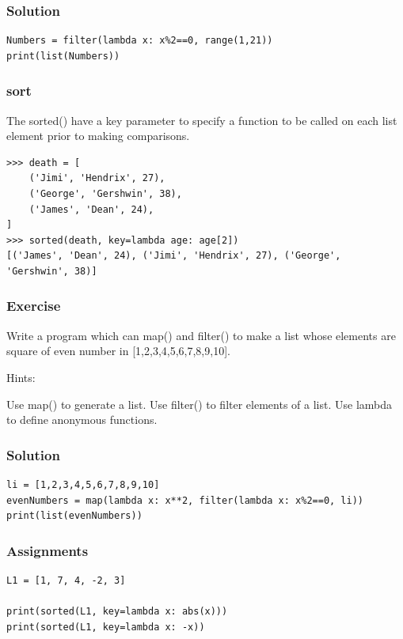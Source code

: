 \begin{frame}[fragile]\frametitle{Solution}
\begin{lstlisting}
Numbers = filter(lambda x: x%2==0, range(1,21))
print(list(Numbers))
\end{lstlisting}
\end{frame}


\begin{frame}[fragile]\frametitle{sort}
The sorted() have a key parameter to specify a function to be called on each list element prior to making comparisons.
\begin{lstlisting}
>>> death = [
    ('Jimi', 'Hendrix', 27),
    ('George', 'Gershwin', 38),
    ('James', 'Dean', 24),
]
>>> sorted(death, key=lambda age: age[2])
[('James', 'Dean', 24), ('Jimi', 'Hendrix', 27), ('George', 'Gershwin', 38)]
\end{lstlisting}
\end{frame}


\begin{frame}[fragile]\frametitle{Exercise}
Write a program which can map() and filter() to make a list whose elements are square of even number in [1,2,3,4,5,6,7,8,9,10].

Hints:

Use map() to generate a list.
Use filter() to filter elements of a list.
Use lambda to define anonymous functions.

\end{frame}

\begin{frame}[fragile]\frametitle{Solution}
\begin{lstlisting}
li = [1,2,3,4,5,6,7,8,9,10]
evenNumbers = map(lambda x: x**2, filter(lambda x: x%2==0, li))
print(list(evenNumbers))
\end{lstlisting}
\end{frame}




\begin{frame}[fragile]\frametitle{Assignments}
    	    \begin{lstlisting}
L1 = [1, 7, 4, -2, 3]

print(sorted(L1, key=lambda x: abs(x)))
print(sorted(L1, key=lambda x: -x))
\end{lstlisting}
\end{frame}

